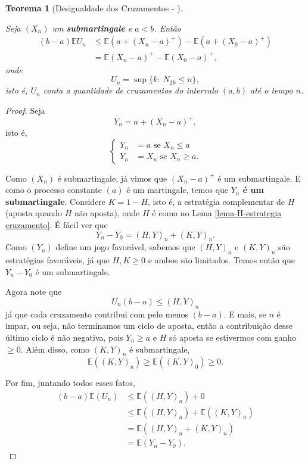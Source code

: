 \documentclass[12pt,a4paper,oneside]{book}
\newtheorem{theorem}{Teorema}[section]
\theoremstyle{definition}
\theoremstyle{remark}
\numberwithin{equation}{section}
\newcommand{\E}{\mathbb{E}}
\begin{document}
\begin{theorem}[Desigualdade dos Cruzamentos - \cite{durrett}]\label{teo-desicruzamentos}

Seja $(X_n)$ um \textbf{submartingale} e $a<b$. Então
\begin{align*}
(b-a)\E U_n &\leq  \E(a+(X_n-a)^+) - \E(a+(X_0-a)^+)\\
&=\E(X_n-a)^+ - \E(X_0-a)^+,
\end{align*}
onde 
$$U_n = \sup\{k:\ N_{2k}\leq n\}, $$
isto é, $U_n$ conta a quantidade de cruzamentos do intervalo $(a,b)$ até o tempo $n$.
\end{theorem}


\begin{proof}
Seja 
$$ Y_n = a + (X_n-a)^+,$$
isto é, 
$$\begin{cases}
Y_n &= a \text{ se } X_n\leq a\\
Y_n &= X_n\text{ se }X_n\geq a.
\end{cases} $$


Como $(X_n)$ é submartingale, já vimos que $(X_n-a)^+$ é um submartingale. E como o processo constante $(a)$ é um martingale, temos que \textbf{$Y_n$ é um submartingale}.
Considere $K = 1-H$, isto é, a estratégia complementar de $H$ (aposta quando $H$ não aposta), onde $H$ é como no Lema \ref{lema-H-estrategia cruzamento}. É fácil ver que
$$Y_n-Y_0 = (H,Y)_n + (K,Y)_n. $$ 
Como $(Y_n)$ define um jogo favorável, sabemos que $(H,Y)_n$ e $(K,Y)_n$ são estratégias favoráveis, já que $H,K\geq 0$ e ambos são limitados. Temos então que
$Y_n - Y_0 $ é um submartingale.

Agora note que
$$U_n (b-a) \leq  (H,Y)_n $$
já que cada cruzamento contribui com pelo menos $(b-a)$. E mais, se $n$ é impar, ou seja, não terminamos um ciclo de aposta, então a contribuição desse último ciclo é não negativa, pois $Y_n\geq a$ e $H$ só aposta se estivermos com ganho $\geq 0$.
Além disso, como $(K,Y)_n$ é submartingale,
$$\E((K,Y)_n)\geq \E((K,Y)_0) \geq 0 . $$

Por fim, juntando todos esses fatos,
\begin{align*}
(b-a)\E(U_n) & \leq \E((H,Y)_n) + 0\\
& \leq \E((H,Y)_n) + \E((K,Y)_n)\\
& = \E((H,Y)_n + (K,Y)_n)\\
& = \E(Y_n - Y_0).
\end{align*}
\end{proof}
\end{document}
